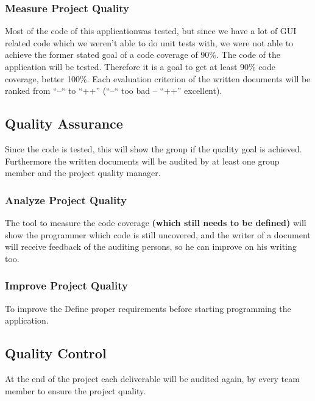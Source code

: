 \subsubsection{Measure Project Quality}
Most of the code of this applicationwas tested, but since we have a lot of GUI related code which we weren't able to do unit tests with, we were not able to achieve the former stated goal of a code coverage of 90\%. 
The code of the application will be tested. Therefore it is a goal to get at least 90\% code coverage, better 100\%. Each evaluation criterion of the written documents will be ranked from “--“ to “++” (“--“ too bad – “++” excellent).
\subsection{Quality Assurance}
Since the code is tested, this will show the group if the quality goal is achieved. Furthermore the written documents will be audited by at least one group member and the project quality manager.
\subsubsection{Analyze Project Quality}
The tool to measure the code coverage \textbf{(which still needs to be defined)} will show the programmer which code is still uncovered, and the writer of a document will receive feedback of the auditing persons, so he can improve on his writing too.
\subsubsection{Improve Project Quality}
To improve the Define proper requirements before starting programming the application.
\subsection{Quality Control}
At the end of the project each deliverable will be audited again, by every team member to ensure the project quality.
